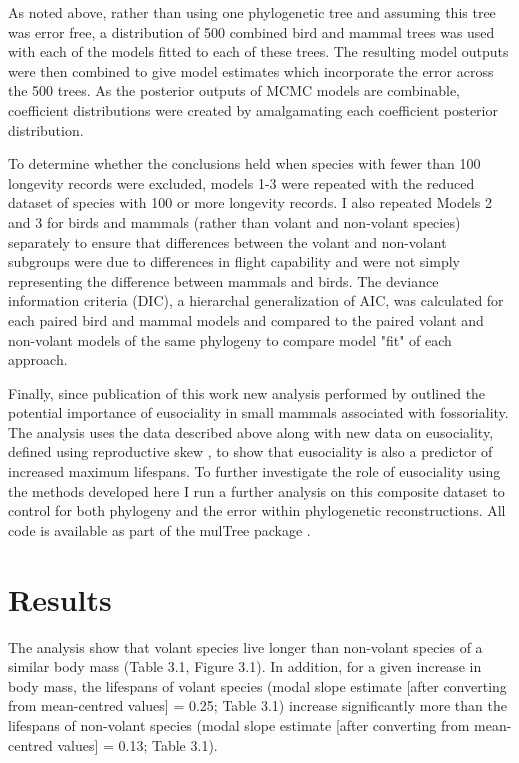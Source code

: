 As noted above, rather than using one phylogenetic tree and assuming this tree was error free, a distribution of 500 combined bird and mammal trees was used with each of the models fitted to each of these trees. The resulting model outputs were then combined to give model estimates which incorporate the error across the 500 trees. As the posterior outputs of MCMC models are combinable, coefficient distributions were created by amalgamating each coefficient posterior distribution. 

To determine whether the conclusions held when species with fewer than 100 longevity records were excluded, models 1-3 were repeated with the reduced dataset of species with 100 or more longevity records. I also repeated Models 2 and 3 for birds and mammals (rather than volant and non-volant species) separately to ensure that differences between the volant and non-volant subgroups were due to differences in flight capability and were not simply representing the difference between mammals and birds. The deviance information criteria (DIC), a hierarchal generalization of AIC, was calculated for each paired bird and mammal models and compared to the paired volant and non-volant models of the same phylogeny to compare model "fit" of each approach.

Finally, since publication of this work \citep{healy2014ecology} new analysis performed by \cite{williams2015ecology} outlined the potential importance of eusociality in small mammals associated with fossoriality. The analysis uses the data described above along with new data on eusociality, defined using reproductive skew \citep{williams2015ecology}, to show that eusociality is also a predictor of increased maximum lifespans. To further investigate the role of eusociality using the methods developed here I run a further analysis on this composite dataset to control for both phylogeny and the error within phylogenetic reconstructions. All code is available as part of the mulTree package \citep{MulTree}.

\section{Results}

The analysis show that volant species live longer than non-volant species of a similar body mass (Table 3.1, Figure 3.1). In addition, for a given increase in body mass, the lifespans of volant species (modal slope estimate [after converting from mean-centred values] = 0.25; Table 3.1) increase significantly more than the lifespans of non-volant species (modal slope estimate [after converting from mean-centred values] = 0.13; Table 3.1).

